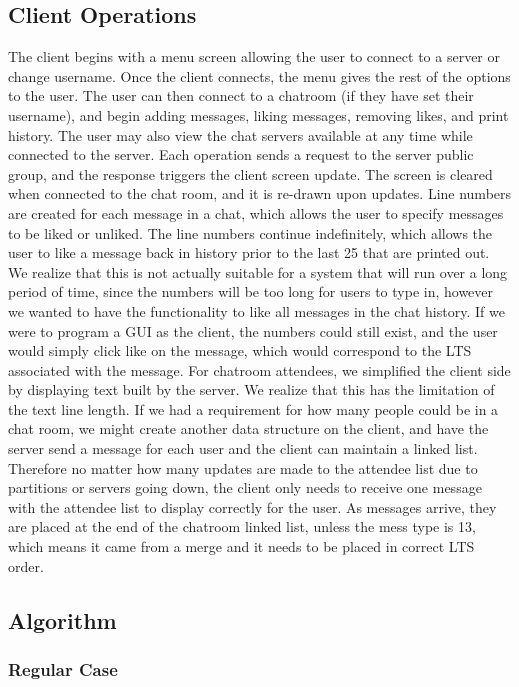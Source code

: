 \documentclass[12pt,journal,compsoc]{IEEEtran}
\begin{document}
\subsection{Client Operations}
The client begins with a menu screen allowing the user to connect to a server or change username.  Once the client connects, the menu gives the rest of the options to the user.  The user can then connect to a chatroom (if they have set their username), and begin adding messages, liking messages, removing likes, and print history.  The user may also view the chat servers available at any time while connected to the server.  Each operation sends a request to the server public group, and the response triggers the client screen update.  The screen is cleared when connected to the chat room, and it is re-drawn upon updates.  Line numbers are created for each message in a chat, which allows the user to specify messages to be liked or unliked.  The line numbers continue indefinitely, which allows the user to like a message back in history prior to the last 25 that are printed out.  We realize that this is not actually suitable for a system that will run over a long period of time, since the numbers will be too long for users to type in, however we wanted to have the functionality to like all messages in the chat history.  If we were to program a GUI as the client, the numbers could still exist, and the user would simply click like on the message, which would correspond to the LTS associated with the message.  For chatroom attendees, we simplified the client side by displaying text built by the server.  We realize that this has the limitation of the text line length.  If we had a requirement for how many people could be in a chat room, we might create another data structure on the client, and have the server send a message for each user and the client can maintain a linked list. Therefore no matter how many updates are made to the attendee list due to partitions or servers going down, the client only needs to receive one message with the attendee list to display correctly for the user.  As messages arrive, they are placed at the end of the chatroom linked list, unless the mess type is 13, which means it came from a merge and it needs to be placed in correct LTS order.

\subsection{Algorithm}

\subsubsection{Regular Case}
\end{document}
